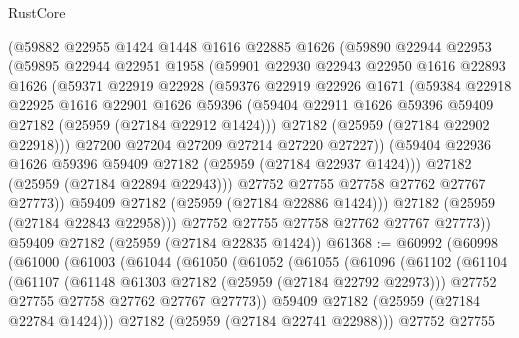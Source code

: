 \begin{lexlean}{RustCore}
\begin{coremodule}
          (@59882
            @22955
            @1424
            @1448
            @1616
            @22885
            @1626
            (@59890
              @22944
              @22953
              (@59895
                @22944
                @22951
                @1958
                (@59901
                  @22930
                  @22943
                  @22950
                  @1616
                  @22893
                  @1626
                  (@59371
                    @22919
                    @22928
                    (@59376
                      @22919
                      @22926
                      @1671
                      (@59384
                        @22918
                        @22925
                        @1616
                        @22901
                        @1626
                        @59396
                        (@59404 @22911 @1626 @59396 @59409 @27182 (@25959 (@27184 @22912 @1424)))
                        @27182
                        (@25959 (@27184 @22902 @22918)))
                      @27200
                      @27204
                      @27209
                      @27214
                      @27220
                      @27227))
                  (@59404 @22936 @1626 @59396 @59409 @27182 (@25959 (@27184 @22937 @1424)))
                  @27182
                  (@25959 (@27184 @22894 @22943)))
                @27752
                @27755
                @27758
                @27762
                @27767
                @27773))
            @59409
            @27182
            (@25959 (@27184 @22886 @1424)))
          @27182
          (@25959 (@27184 @22843 @22958)))
        @27752
        @27755
        @27758
        @27762
        @27767
        @27773))
    @59409
    @27182
    (@25959 (@27184 @22835 @1424))
@61368 := @60992
    (@60998
      (@61000
        (@61003
          (@61044
            (@61050
              (@61052
                (@61055
                  (@61096
                    (@61102
                      (@61104
                        (@61107
                          (@61148 @61303 @27182 (@25959 (@27184 @22792 @22973)))
                          @27752
                          @27755
                          @27758
                          @27762
                          @27767
                          @27773))
                      @59409
                      @27182
                      (@25959 (@27184 @22784 @1424)))
                    @27182
                    (@25959 (@27184 @22741 @22988)))
                  @27752
                  @27755

\end{coremodule}
\end{lexlean}
